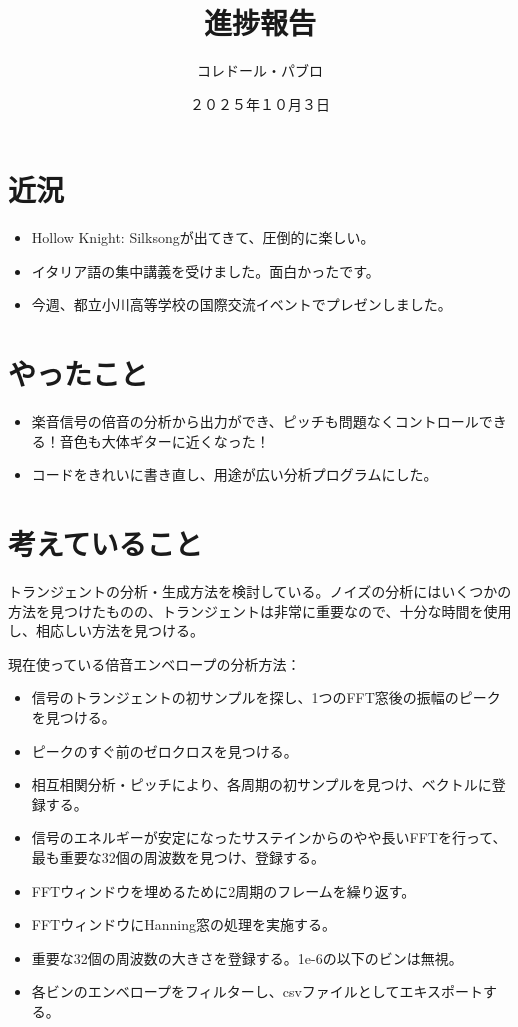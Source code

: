 \documentclass[a4paper, 12pt]{article}
\title{進捗報告}
\author{コレドール・パブロ}
\date{２０２５年１０月３日}
\begin{document}
\maketitle

\section*{近況}
\begin{itemize}
    \item Hollow Knight: Silksongが出てきて、圧倒的に楽しい。
    \item イタリア語の集中講義を受けました。面白かったです。
    \item 今週、都立小川高等学校の国際交流イベントでプレゼンしました。
\end{itemize} 

\section*{やったこと}
\begin{itemize}
    \item 楽音信号の倍音の分析から出力ができ、ピッチも問題なくコントロールできる！音色も大体ギターに近くなった！\cite{sitrano}
    \item コードをきれいに書き直し、用途が広い分析プログラムにした。
\end{itemize}

\section*{考えていること}

トランジェントの分析・生成方法を検討している。ノイズの分析にはいくつかの方法を見つけたものの、トランジェントは非常に重要なので、十分な時間を使用し、相応しい方法を見つける。

現在使っている倍音エンベロープの分析方法：

\begin{itemize}
    \item 信号のトランジェントの初サンプルを探し、1つのFFT窓後の振幅のピークを見つける。
    \item ピークのすぐ前のゼロクロスを見つける。
    \item 相互相関分析・ピッチにより、各周期の初サンプルを見つけ、ベクトルに登録する。
    \item 信号のエネルギーが安定になったサステインからのやや長いFFTを行って、最も重要な32個の周波数を見つけ、登録する。
    \item FFTウィンドウを埋めるために2周期のフレームを繰り返す。
    \item FFTウィンドウにHanning窓の処理を実施する。
    \item 重要な32個の周波数の大きさを登録する。1e-6の以下のビンは無視。
    \item 各ビンのエンベロープをフィルターし、csvファイルとしてエキスポートする。
\end{itemize}
\end{document}
